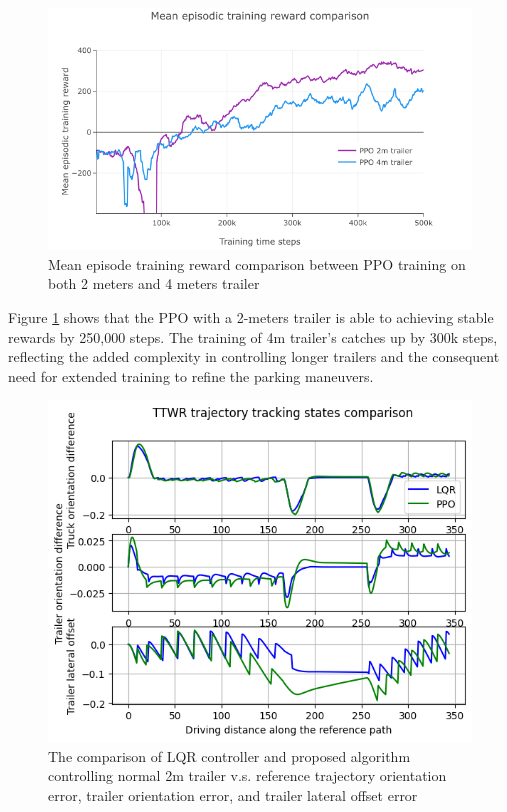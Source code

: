 \begin{figure}[htbp]
\centerline{\includegraphics[width=0.8\linewidth]{fig/knownMBRL/Mean episodic training reward.png}}
\caption{Mean episode training reward comparison between PPO training on both 2 meters and 4 meters trailer}
\label{fig:Mean episodic training reward}
\end{figure}

Figure \ref{fig:Mean episodic training reward} shows that the PPO with a 2-meters trailer is able to achieving stable rewards by 250,000 steps. The training of 4m trailer's catches up by 300k steps, reflecting the added complexity in controlling longer trailers and the consequent need for extended training to refine the parking maneuvers.

\begin{figure}[htbp]
\centerline{\includegraphics[width=0.8\linewidth]{fig/knownMBRL/comparison of lqr ppo.png}}
\caption{The comparison of LQR controller and proposed algorithm controlling normal 2m trailer v.s. reference trajectory orientation error, trailer orientation error, and trailer lateral offset error}
\label{fig: parking error comparison}
\end{figure}


